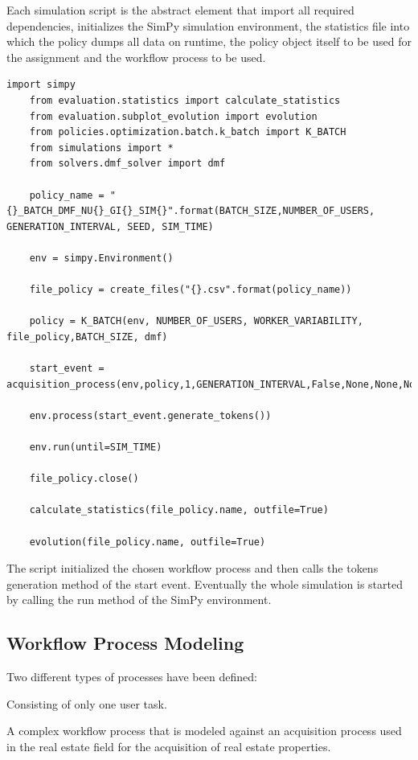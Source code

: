 \documentclass{seal_thesis}
\begin{document}
Each simulation script is the abstract element that import all required dependencies, initializes the SimPy simulation environment, the statistics file into which the policy dumps all data on runtime, the policy object itself to be used for the assignment and the workflow process to be used. 

\begin{lstlisting}[caption=Example of the structure of a simulation script. Here for the K-Batch policy using the \gls{dmf} solver,label=lst:simulation_script,style=CustomPython]
	import simpy
	from evaluation.statistics import calculate_statistics
	from evaluation.subplot_evolution import evolution
	from policies.optimization.batch.k_batch import K_BATCH
	from simulations import *
	from solvers.dmf_solver import dmf

	policy_name = "{}_BATCH_DMF_NU{}_GI{}_SIM{}".format(BATCH_SIZE,NUMBER_OF_USERS, GENERATION_INTERVAL, SEED, SIM_TIME)

	env = simpy.Environment()

	file_policy = create_files("{}.csv".format(policy_name))

	policy = K_BATCH(env, NUMBER_OF_USERS, WORKER_VARIABILITY, file_policy,BATCH_SIZE, dmf)

	start_event = acquisition_process(env,policy,1,GENERATION_INTERVAL,False,None,None,None)

	env.process(start_event.generate_tokens())

	env.run(until=SIM_TIME)

	file_policy.close()

	calculate_statistics(file_policy.name, outfile=True)

	evolution(file_policy.name, outfile=True)
\end{lstlisting}

The script initialized the chosen workflow process and then calls the tokens generation method of the start event. Eventually the whole simulation is started by calling the run method of the SimPy environment.

\subsection{Workflow Process Modeling}

Two different types of processes have been defined:
\begin{enumerate*}
	\item Consisting of only one user task.
	\item A complex workflow process that is modeled against an acquisition process used in the real estate field for the acquisition of real estate properties.
\end{enumerate*}
\end{document}
